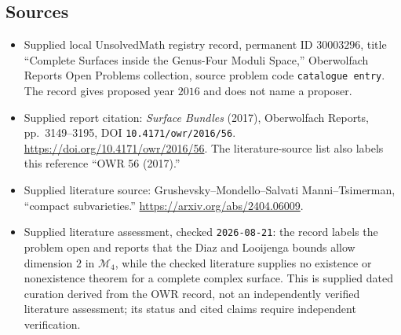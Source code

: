 \documentclass[11pt]{article}
\begin{document}
\subsection{Sources}
\begin{itemize}
\item Supplied local UnsolvedMath registry record, permanent ID \(30003296\), title ``Complete Surfaces inside the Genus-Four Moduli Space,'' Oberwolfach Reports Open Problems collection, source problem code \texttt{catalogue entry}. The record gives proposed year \(2016\) and does not name a proposer.
\item Supplied report citation: \emph{Surface Bundles} (2017), Oberwolfach Reports, pp.~3149--3195, DOI \texttt{10.4171/owr/2016/56}. \url{https://doi.org/10.4171/owr/2016/56}. The literature-source list also labels this reference ``OWR 56 (2017).''
\item Supplied literature source: Grushevsky--Mondello--Salvati Manni--Tsimerman, ``compact subvarieties.'' \url{https://arxiv.org/abs/2404.06009}.
\item Supplied literature assessment, checked \texttt{2026-08-21}: the record labels the problem open and reports that the Diaz and Looijenga bounds allow dimension \(2\) in \(\mathcal M_4\), while the checked literature supplies no existence or nonexistence theorem for a complete complex surface. This is supplied dated curation derived from the OWR record, not an independently verified literature assessment; its status and cited claims require independent verification.
\end{itemize}
\end{document}
